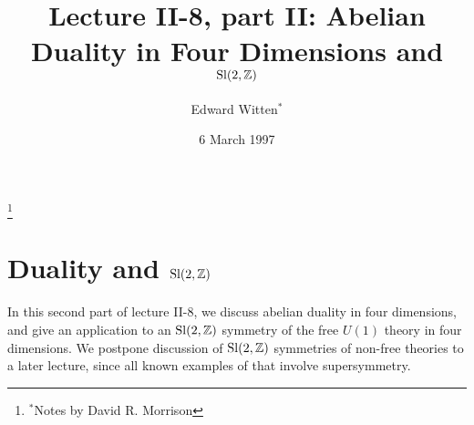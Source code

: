 \newcommand{\lb}{{\Scr L}}
\newcommand{\lbm}{{\Scr M}} %
\newcommand{\lbn}{{\Scr N}} %
\renewcommand{\lg}{{\cal L}}

\newcommand{\cb}{{\Scr S}}


\newcommand{\ee}{\text{e}}

\newcommand{\cD}{{\cal D}}

\newcommand{\cO}{{\cal O}}

\newcommand{\cF}{{\cal F}}
\newcommand{\cG}{{\cal G}}
\newcommand{\cH}{{\cal H}}

\newcommand{\IR}{{\Bbb R}}
\newcommand{\IZ}{{\Bbb Z}}

\newcommand{\vol}{\operatorname{\rm vol}}
\newcommand{\volbar}{\operatorname{\overline{\rm vol}}}
\newcommand{\voltilde}{\operatorname{\widetilde{\rm vol}}}
\newcommand{\Tr}{\operatorname{\rm Tr}}
\newcommand{\Hol}{\operatorname{\rm Hol}}
\newcommand{\Funct}{\operatorname{\rm Funct}}


\addtolength{\marginparwidth}{-.4in}
\newcommand{\note}[1]{\marginpar{\scriptsize #1 }}



\title[]{Lecture II-8, part II: Abelian Duality in Four Dimensions and
$\Sl(2,\IZ)$}
\author[]{Edward Witten$^*$}
\thanks{$^*$Notes by David R. Morrison}
\date{6 March 1997}
\maketitle

\section{Duality and $\Sl(2,\IZ)$}

In this second part of lecture II-8, we discuss abelian duality in four
dimensions, and give an application to an $\Sl(2,\IZ)$ symmetry of the free
$U(1)$ theory in four dimensions.  We postpone discussion of $\Sl(2,\IZ)$
symmetries of non-free theories to a later lecture, since all
known examples of
that involve supersymmetry.

